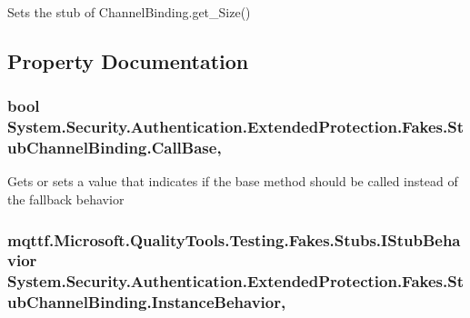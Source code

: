 Sets the stub of Channel\-Binding.\-get\-\_\-\-Size()



\subsection{Property Documentation}
\hypertarget{class_system_1_1_security_1_1_authentication_1_1_extended_protection_1_1_fakes_1_1_stub_channel_binding_a3ca91298f36bd76e81784dd556674629}{
\subsubsection[{Call\-Base}]{\setlength{\rightskip}{0pt plus 5cm}bool System.\-Security.\-Authentication.\-Extended\-Protection.\-Fakes.\-Stub\-Channel\-Binding.\-Call\-Base\hspace{0.3cm}{\ttfamily [get]}, {\ttfamily [set]}}}\label{class_system_1_1_security_1_1_authentication_1_1_extended_protection_1_1_fakes_1_1_stub_channel_binding_a3ca91298f36bd76e81784dd556674629}


Gets or sets a value that indicates if the base method should be called instead of the fallback behavior

\hypertarget{class_system_1_1_security_1_1_authentication_1_1_extended_protection_1_1_fakes_1_1_stub_channel_binding_a09f667783ab2b538abf511b15b937a22}{
\subsubsection[{Instance\-Behavior}]{\setlength{\rightskip}{0pt plus 5cm}mqttf.\-Microsoft.\-Quality\-Tools.\-Testing.\-Fakes.\-Stubs.\-I\-Stub\-Behavior System.\-Security.\-Authentication.\-Extended\-Protection.\-Fakes.\-Stub\-Channel\-Binding.\-Instance\-Behavior\hspace{0.3cm}{\ttfamily [get]}, {\ttfamily [set]}}}\label{class_system_1_1_security_1_1_authentication_1_1_extended_protection_1_1_fakes_1_1_stub_channel_binding_a09f667783ab2b538abf511b15b937a22}


